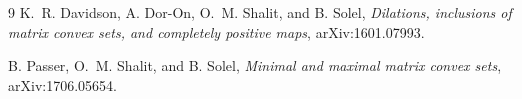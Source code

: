 \documentclass[11pt]{article}
\begin{document}
\begin{thebibliography}{9}
K.~R. Davidson, A. Dor-On, O.~M. Shalit, and B. Solel,
\emph{Dilations, inclusions of matrix convex sets, and completely positive
maps}, arXiv:1601.07993.

B. Passer, O.~M. Shalit, and B. Solel,
\emph{Minimal and maximal matrix convex sets}, arXiv:1706.05654.
\end{thebibliography}
\end{document}

